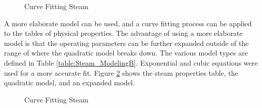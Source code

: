     \begin{figure}[ht]
        \begin{center}
        \caption{Curve Fitting Steam}
        \label{fig:Curve_Fit_SteamA}
        \end{center}
    \end{figure}
    
    A more elaborate model can be used, and a curve fitting process can be applied to the tables of physical properties. The advantage of using a more elaborate model is that the operating parameters can be further expanded outside of the range of where the quadratic model breaks down. The various model types are defined in Table \ref{table:Steam_ModelingB}. Exponential and cubic equations were used for a more accurate fit. Figure \ref{fig:Curve_Fit_SteamB} shows the steam properties table, the quadratic model, and an expanded model. 
    
    \begin{figure}[ht]
        \begin{center}
        \caption{Curve Fitting Steam}
        \label{fig:Curve_Fit_SteamB}
        \end{center}
    \end{figure}
    
